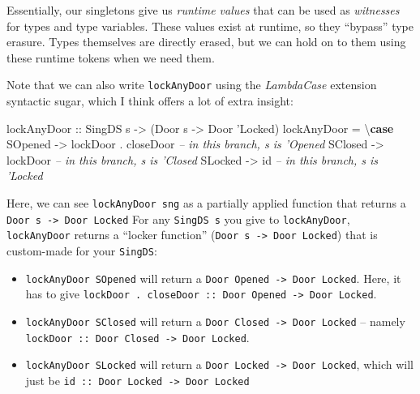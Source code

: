 \documentclass[]{article}
\newenvironment{Shaded}{}{}
\newcommand{\CommentTok}[1]{\textcolor[rgb]{0.38,0.63,0.69}{\textit{#1}}}
\newcommand{\DataTypeTok}[1]{\textcolor[rgb]{0.56,0.13,0.00}{#1}}
\newcommand{\FunctionTok}[1]{\textcolor[rgb]{0.02,0.16,0.49}{#1}}
\newcommand{\KeywordTok}[1]{\textcolor[rgb]{0.00,0.44,0.13}{\textbf{#1}}}
\newcommand{\NormalTok}[1]{#1}
\newcommand{\OtherTok}[1]{\textcolor[rgb]{0.00,0.44,0.13}{#1}}
\begin{document}
Essentially, our singletons give us \emph{runtime values} that can be used as
\emph{witnesses} for types and type variables. These values exist at runtime, so
they ``bypass'' type erasure. Types themselves are directly erased, but we can
hold on to them using these runtime tokens when we need them.

Note that we can also write \texttt{lockAnyDoor} using the \emph{LambdaCase}
extension syntactic sugar, which I think offers a lot of extra insight:

\begin{Shaded}
\begin{Highlighting}[]
\OtherTok{lockAnyDoor ::} \DataTypeTok{SingDS}\NormalTok{ s }\OtherTok{->}\NormalTok{ (}\DataTypeTok{Door}\NormalTok{ s }\OtherTok{->} \DataTypeTok{Door}\NormalTok{ '}\DataTypeTok{Locked}\NormalTok{)}
\NormalTok{lockAnyDoor }\FunctionTok{=}\NormalTok{ \textbackslash{}}\KeywordTok{case}
    \DataTypeTok{SOpened} \OtherTok{->}\NormalTok{ lockDoor }\FunctionTok{.}\NormalTok{ closeDoor  }\CommentTok{-- in this branch, s is 'Opened}
    \DataTypeTok{SClosed} \OtherTok{->}\NormalTok{ lockDoor              }\CommentTok{-- in this branch, s is 'Closed}
    \DataTypeTok{SLocked} \OtherTok{->}\NormalTok{ id                    }\CommentTok{-- in this branch, s is 'Locked}
\end{Highlighting}
\end{Shaded}

Here, we can see \texttt{lockAnyDoor\ sng} as a partially applied function that
returns a \texttt{Door\ s\ -\textgreater{}\ Door\ \textquotesingle{}Locked} For
any \texttt{SingDS\ s} you give to \texttt{lockAnyDoor}, \texttt{lockAnyDoor}
returns a ``locker function''
(\texttt{Door\ s\ -\textgreater{}\ Door\ \textquotesingle{}Locked}) that is
custom-made for your \texttt{SingDS}:

\begin{itemize}
\item
  \texttt{lockAnyDoor\ SOpened} will return a
  \texttt{Door\ \textquotesingle{}Opened\ -\textgreater{}\ Door\ \textquotesingle{}Locked}.
  Here, it has to give
  \texttt{lockDoor\ .\ closeDoor\ ::\ Door\ \textquotesingle{}Opened\ -\textgreater{}\ Door\ \textquotesingle{}Locked}.
\item
  \texttt{lockAnyDoor\ SClosed} will return a
  \texttt{Door\ \textquotesingle{}Closed\ -\textgreater{}\ Door\ \textquotesingle{}Locked}
  -- namely
  \texttt{lockDoor\ ::\ Door\ \textquotesingle{}Closed\ -\textgreater{}\ Door\ \textquotesingle{}Locked}.
\item
  \texttt{lockAnyDoor\ SLocked} will return a
  \texttt{Door\ \textquotesingle{}Locked\ -\textgreater{}\ Door\ \textquotesingle{}Locked},
  which will just be
  \texttt{id\ ::\ Door\ \textquotesingle{}Locked\ -\textgreater{}\ Door\ \textquotesingle{}Locked}
\end{itemize}
\end{document}
